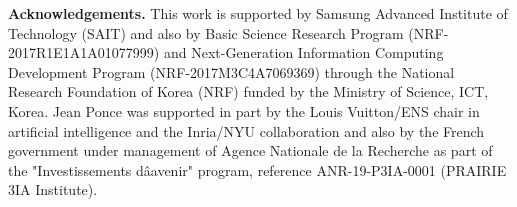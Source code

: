 \documentclass[runningheads]{llncs}
\begin{document}
\bigskip
\noindent \textbf{Acknowledgements.}
This work is supported by Samsung Advanced Institute of Technology (SAIT) and also by Basic Science Research Program (NRF-2017R1E1A1A01077999) and Next-Generation Information Computing Development Program (NRF-2017M3C4A7069369) through the National Research Foundation of Korea (NRF) funded by the Ministry of Science, ICT, Korea. 
Jean Ponce was supported in part by the Louis Vuitton/ENS chair in artificial intelligence and the Inria/NYU collaboration and also by the French government under management of Agence Nationale de la Recherche as part of the "Investissements dâavenir" program, reference ANR-19-P3IA-0001 (PRAIRIE 3IA Institute). 

{\small
    
    
}
\end{document}
